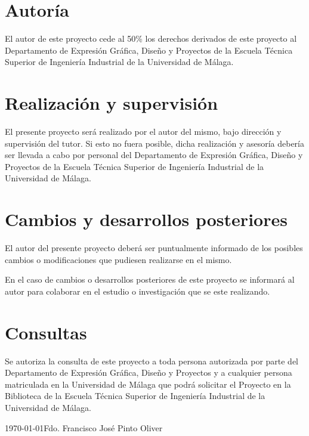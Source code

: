 \section{Autoría}
El autor de este proyecto cede al 50\% los derechos derivados de este proyecto al Departamento de Expresión Gráfica, Diseño y Proyectos de la Escuela Técnica Superior de Ingeniería Industrial de la Universidad de Málaga.

\section{Realización y supervisión}
El presente proyecto será realizado por el autor del mismo, bajo dirección y supervisión del tutor. Si esto no fuera posible, dicha realización y asesoría debería ser llevada a cabo por personal del Departamento de Expresión Gráfica, Diseño y Proyectos de la Escuela Técnica Superior de Ingeniería Industrial de la Universidad de Málaga.

\section{Cambios y desarrollos posteriores}
El autor del presente proyecto deberá ser puntualmente informado de los posibles cambios o modificaciones que pudiesen realizarse en el mismo.

En el caso de cambios o desarrollos posteriores de este proyecto se informará al autor para colaborar en el estudio o investigación que se este realizando.

\section{Consultas}
Se autoriza la consulta de este proyecto a toda persona autorizada por parte del Departamento de Expresión Gráfica, Diseño y Proyectos y a cualquier persona matriculada en la Universidad de Málaga que podrá solicitar el Proyecto en la Biblioteca de la Escuela Técnica Superior de Ingeniería Industrial de la Universidad de Málaga.

\vspace{1cm}
\today \hfill Fdo. Francisco José Pinto Oliver
